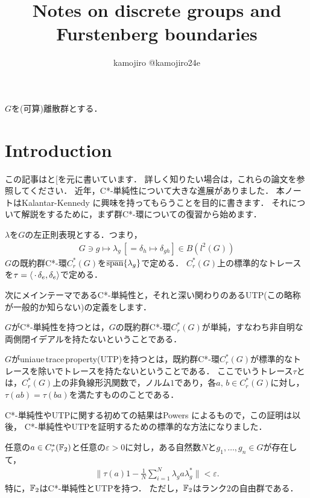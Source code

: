 \documentclass{jsarticle}[12pt]
\author{kamojiro @kamojiro24e}
\title{Notes on discrete groups and Furstenberg boundaries}
\begin{document}
\maketitle
\tableofcontents
$G$を(可算)離散群とする．
\section{Introduction}
この記事は\cite{Kalantar2017boundaries}と[\cite{breuillard2017c}を元に書いています．
詳しく知りたい場合は，これらの論文を参照してください．
近年，C*-単純性について大きな進展がありました．
本ノートはKalantar-Kennedy \cite{Kalantar2017boundaries}に興味を持ってもらうことを目的に書きます．
それについて解説をするために，まず群C*-環についての復習から始めます．
\begin{definition}
  $\lambda$を$G$の左正則表現とする．つまり，
  \begin{align*}
    G \ni g \mapsto \lambda_g \, [ = \delta_h \mapsto \delta_{gh}] \in B(l^2(G))
  \end{align*}
  $G$の既約群C*-環$C_r^*(G)$を$\overline{\rm span}\{\lambda_g \}$で定める．
  $C_r^*(G)$上の標準的なトレースを$\tau = \langle \, \cdot \, \delta_e, \delta_e\rangle$で定める．
\end{definition}
次にメインテーマであるC*-単純性と，それと深い関わりのあるUTP(この略称が一般的か知らない)の定義をします．
\begin{definition}
  $G$がC*-単純性を持つとは，$G$の既約群C*-環$C_r^*(G)$が単純，すなわち非自明な両側閉イデアルを持たないということである．

  $G$がuniaue\,trace\,property(UTP)を持つとは，既約群C*-環$C_r^*(G)$が標準的なトレースを除いでトレースを持たないということである．
  ここでいうトレース$\tau$とは，$C_r^*(G)$上の非負線形汎関数で，ノルム$1$であり，各$a,\, b \in C_r^*(G)$に対し，
  $\tau(ab) = \tau(ba)$を満たすもののことである．
\end{definition}
C*-単純性やUTPに関する初めての結果はPowers \cite{powers1975simplicity}によるもので，この証明は以後，
C*-単純性やUTPを証明するための標準的な方法になりました．
\begin{theorem}
  任意の$a \in C_r^*(\mathbb{F}_2)$と任意の$\varepsilon > 0$に対し，ある自然数$N$と$g_1, \ldots, g_n \in G$が存在して，
  \begin{align*}
    \| \tau(a)1 - \frac{1}{N}\sum_{i=1}^N\lambda_g a \lambda_g^*\| < \varepsilon.
  \end{align*}
  特に，$\mathbb{F}_2$はC*-単純性とUTPを持つ．
  ただし，$\mathbb{F}_2$はランク$2$の自由群である．
\end{theorem}
\end{document}
